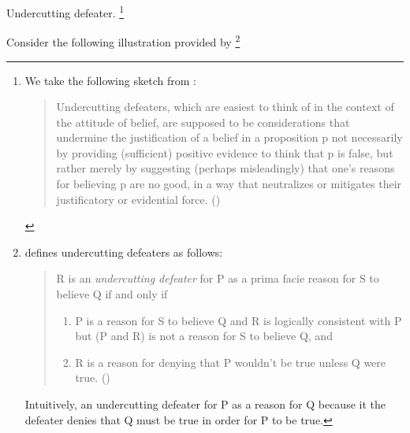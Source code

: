 \begin{note}
  Undercutting defeater.%
  \footnote{
    We take the following sketch from \textcite{Worsnip:2018aa}:
  \begin{quote}
    Undercutting defeaters, which are easiest to think of in the context of the attitude of belief, are supposed to be considerations that undermine the justification of a belief in a proposition p not necessarily by providing (sufficient) positive evidence to think that p is false, but rather merely by suggesting (perhaps misleadingly) that one’s reasons for believing p are no good, in a way that neutralizes or mitigates their justificatory or evidential force.%
    \mbox{}\hfill\mbox{(\citeyear[29]{Worsnip:2018aa})}
  \end{quote}
  }

  Consider the following illustration provided by \citeauthor{Pollock:1987un}%
  \footnote{
    \citeauthor{Pollock:1987un} defines undercutting defeaters as follows:
    \begin{quote}
      R is an \emph{undercutting defeater} for P as a prima facie reason for S to believe Q if and only if
      \begin{enumerate}[label=(UD\arabic*), ref=(UD\arabic*)]
      \item
        P is a reason for S to believe Q and R is logically consistent with P but (P and R) is not a reason for S to believe Q, and
      \item
        R is a reason for denying that P wouldn't be true unless Q were true.%
        \mbox{}\hfill\mbox{(\citeyear[485]{Pollock:1987un})}
      \end{enumerate}
    \end{quote}
    Intuitively, an undercutting defeater for P as a reason for Q because it the defeater denies that Q must be true in order for P to be true.

}
\end{note}
